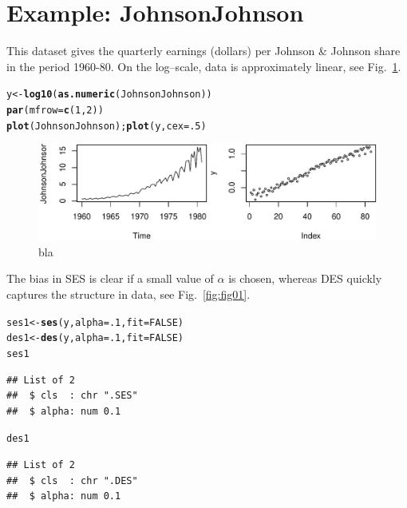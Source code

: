 \documentclass[10pt]{article}\usepackage[]{graphicx}\usepackage[]{color}
\makeatletter
\def\maxwidth{ %
  \ifdim\Gin@nat@width>\linewidth
    \linewidth
  \else
    \Gin@nat@width
  \fi
}
\newcommand{\hlnum}[1]{\textcolor[rgb]{0.686,0.059,0.569}{#1}}%
\newcommand{\hlstd}[1]{\textcolor[rgb]{0.345,0.345,0.345}{#1}}%
\newcommand{\hlkwb}[1]{\textcolor[rgb]{0.69,0.353,0.396}{#1}}%
\newcommand{\hlkwc}[1]{\textcolor[rgb]{0.333,0.667,0.333}{#1}}%
\newcommand{\hlkwd}[1]{\textcolor[rgb]{0.737,0.353,0.396}{\textbf{#1}}}%
\newenvironment{kframe}{%
 \def\at@end@of@kframe{}%
 \ifinner\ifhmode%
  \def\at@end@of@kframe{\end{minipage}}%
  \begin{minipage}{\columnwidth}%
 \fi\fi%
 \def\FrameCommand##1{\hskip\@totalleftmargin \hskip-\fboxsep
 \colorbox{shadecolor}{##1}\hskip-\fboxsep
     \hskip-\linewidth \hskip-\@totalleftmargin \hskip\columnwidth}%
 \MakeFramed {\advance\hsize-\width
   \@totalleftmargin\z@ \linewidth\hsize
   \@setminipage}}%
 {\par\unskip\endMakeFramed%
 \at@end@of@kframe}
\newenvironment{knitrout}{}{} %
\makeatother
\begin{document}
\section{Example: JohnsonJohnson}
\label{example:johnson}

This dataset gives the quarterly earnings (dollars) per Johnson \&
Johnson share in the period 1960-80. On the log--scale, data is approximately linear, see Fig.~\ref{fig:fig00}.

\begin{knitrout}
\color{fgcolor}\begin{kframe}
\begin{alltt}
\hlstd{y} \hlkwb{<-} \hlkwd{log10}\hlstd{(}\hlkwd{as.numeric}\hlstd{(JohnsonJohnson))}
\hlkwd{par}\hlstd{(}\hlkwc{mfrow}\hlstd{=}\hlkwd{c}\hlstd{(}\hlnum{1}\hlstd{,}\hlnum{2}\hlstd{))}
\hlkwd{plot}\hlstd{(JohnsonJohnson);} \hlkwd{plot}\hlstd{(y,} \hlkwc{cex}\hlstd{=}\hlnum{.5}\hlstd{)}
\end{alltt}
\end{kframe}\begin{figure}
\includegraphics[width=\maxwidth]{fig/graphfig00-1} \caption[bla]{bla}\label{fig:fig00}
\end{figure}


\end{knitrout}


The bias in SES is clear if a small value of $\alpha$ is chosen, whereas DES quickly captures the structure in data, see Fig.~\ref{fig:fig01}.

\begin{knitrout}
\color{fgcolor}\begin{kframe}
\begin{alltt}
\hlstd{ses1} \hlkwb{<-} \hlkwd{ses}\hlstd{(y,} \hlkwc{alpha}\hlstd{=}\hlnum{.1}\hlstd{,} \hlkwc{fit}\hlstd{=}\hlnum{FALSE}\hlstd{)}
\hlstd{des1} \hlkwb{<-} \hlkwd{des}\hlstd{(y,} \hlkwc{alpha}\hlstd{=}\hlnum{.1}\hlstd{,} \hlkwc{fit}\hlstd{=}\hlnum{FALSE}\hlstd{)}
\hlstd{ses1}
\end{alltt}
\begin{verbatim}
## List of 2
##  $ cls  : chr ".SES"
##  $ alpha: num 0.1
\end{verbatim}
\begin{alltt}
\hlstd{des1}
\end{alltt}
\begin{verbatim}
## List of 2
##  $ cls  : chr ".DES"
##  $ alpha: num 0.1
\end{verbatim}
\end{kframe}
\end{knitrout}
\end{document}
